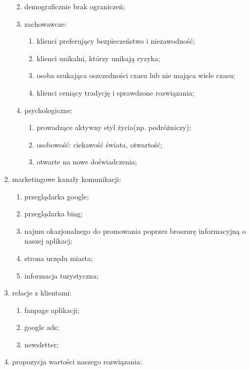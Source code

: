 \begin{enumerate}[label=\Roman*.]
\begin{enumerate}[label=\alph*.]
\begin{enumerate}[label=\roman*.]
        \end{enumerate}
        \item demograficznie brak ograniczeń;
        \item zachowawcze:
        \begin{enumerate}[label=\roman*.]
            \item klienci preferujący bezpieczeństwo i niezawodność;
            \item klienci unikalni, którzy unikają ryzyka;
            \item osoba szukająca oszczedności czasu lub nie mająca wiele czasu;
            \item klienci ceniący tradycję i sprawdzone rozwiązania;
        \end{enumerate}
        \item psychologiczne:
        \begin{enumerate}[label=\roman*.]
            \item prowadzące aktywny styl życia(np. podróżniczy);
            \item osobowość: ciekawość świata, otwartość;
            \item otwarte na nowe doświadczenia;
        \end{enumerate}
    \end{enumerate}
    \item marketingowe kanały komunikacji:
    \begin{enumerate}[label=\roman*.]
        \item przeglądarka google;
        \item przeglądarka bing;
        \item najmu okazjonalnego do promowania poprzez broszurę informacyjną o naszej aplikacj;
        \item strona urzędu miasta;
        \item informacja turystyczna;
    \end{enumerate}
    \item relacje z klientami:
    \begin{enumerate}[label=\roman*.]
        \item fanpage aplikacji;
        \item google ads;
        \item newsletter;
    \end{enumerate}
    \item propozycja wartości naszego rozwiązania:
    \begin{enumerate}[label=\alph*.]

\end{enumerate}
\end{enumerate}
